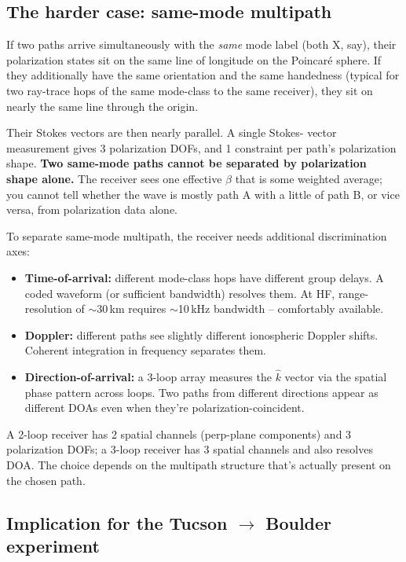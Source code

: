 \documentclass[11pt]{article}
\begin{document}
\subsection*{The harder case: same-mode multipath}

If two paths arrive simultaneously with the \emph{same} mode label
(both X, say), their polarization states sit on the same line of
longitude on the Poincar\'e sphere.  If they additionally have the
same orientation and the same handedness (typical for two ray-trace
hops of the same mode-class to the same receiver), they sit on
nearly the same line through the origin.

Their Stokes vectors are then nearly parallel.  A single Stokes-
vector measurement gives 3 polarization DOFs, and 1 constraint per
path's polarization shape.  \textbf{Two same-mode paths cannot be
separated by polarization shape alone.}  The receiver sees one
effective $\beta$ that is some weighted average; you cannot tell
whether the wave is mostly path A with a little of path B, or vice
versa, from polarization data alone.

To separate same-mode multipath, the receiver needs additional
discrimination axes:
\begin{itemize}
\item \textbf{Time-of-arrival:} different mode-class hops have
different group delays.  A coded waveform (or sufficient bandwidth)
resolves them.  At HF, range-resolution of $\sim$30\,km requires
$\sim$10\,kHz bandwidth -- comfortably available.
\item \textbf{Doppler:} different paths see slightly different
ionospheric Doppler shifts.  Coherent integration in frequency
separates them.
\item \textbf{Direction-of-arrival:} a 3-loop array measures the
$\hat k$ vector via the spatial phase pattern across loops.  Two
paths from different directions appear as different DOAs even when
they're polarization-coincident.
\end{itemize}

A 2-loop receiver has 2 spatial channels (perp-plane components) and
3 polarization DOFs; a 3-loop receiver has 3 spatial channels and
also resolves DOA.  The choice depends on the multipath structure
that's actually present on the chosen path.

\subsection*{Implication for the Tucson $\to$ Boulder experiment}
\end{document}
